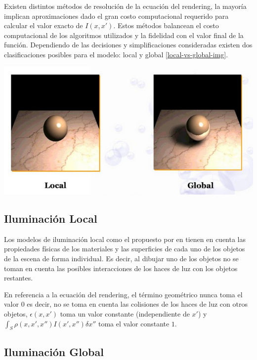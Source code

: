 Existen distintos métodos de resolución de la ecuación del rendering, la mayoría implican aproximaciones dado el gran costo 
computacional requerido para calcular el valor exacto de $I(x,x')$. Estos métodos balancean el costo computacional de los algoritmos
utilizados y la fidelidad con el valor final de la función. Dependiendo de las decisiones y simplificaciones consideradas
existen dos clasificaciones posibles para el modelo: local y global \ref{local-vs-global-img}.

\begin{minipage}[h]{0.8\linewidth}
    \includegraphics[width=\linewidth]{assets/local_vs_global}
    \label{local-vs-global-img}
\end{minipage}

\subsection{Iluminación Local}
\label{sec:ilumlocal}
Los modelos de iluminación local como el propuesto por \citeauthor{Phong} en \citeyear{Phong} tienen en cuenta las propiedades físicas de los materiales
y las superficies de cada uno de los objetos de la escena de forma individual. Es decir, al dibujar uno de los
objetos no se toman en cuenta las posibles interacciones de los haces de luz con los objetos restantes.

En referencia a la ecuación del rendering, el término
geométrico nunca toma el valor 0 es decir, no se toma en cuenta las colisiones de los haces de luz con otros
objetos, $\epsilon(x,x')$ toma un valor constante (independiente de $x'$) y $\int_{S} \rho(x,x',x'')I(x',x'') \delta x''$ toma el valor constante $1$.

\subsection{Iluminación Global}
\label{sec:ilumglobal}


